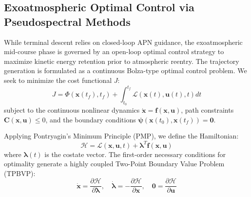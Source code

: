 \documentclass[11pt,a4paper]{article}
\theoremstyle{definition}
\numberwithin{equation}{section}
\begin{document}
\begin{appendices}
\section{Exoatmospheric Optimal Control via Pseudospectral Methods}
\label{app:optimal_control}

While terminal descent relies on closed-loop APN guidance, the exoatmospheric mid-course phase is governed by an open-loop optimal control strategy to maximize kinetic energy retention prior to atmospheric reentry. The trajectory generation is formulated as a continuous Bolza-type optimal control problem. We seek to minimize the cost functional $J$:
\begin{equation}
    J = \Phi(\mathbf{x}(t_f), t_f) + \int_{t_0}^{t_f} \mathcal{L}(\mathbf{x}(t), \mathbf{u}(t), t) dt
\end{equation}
subject to the continuous nonlinear dynamics $\mathbf{\dot{x}} = \mathbf{f}(\mathbf{x}, \mathbf{u})$, path constraints $\mathbf{C}(\mathbf{x}, \mathbf{u}) \leq 0$, and the boundary conditions $\boldsymbol{\psi}(\mathbf{x}(t_0), \mathbf{x}(t_f)) = \mathbf{0}$.

Applying Pontryagin's Minimum Principle (PMP), we define the Hamiltonian:
\begin{equation}
    \mathcal{H} = \mathcal{L}(\mathbf{x}, \mathbf{u}, t) + \boldsymbol{\lambda}^T \mathbf{f}(\mathbf{x}, \mathbf{u})
\end{equation}
where $\boldsymbol{\lambda}(t)$ is the costate vector. The first-order necessary conditions for optimality generate a highly coupled Two-Point Boundary Value Problem (TPBVP):
\begin{equation}
    \mathbf{\dot{x}} = \frac{\partial \mathcal{H}}{\partial \boldsymbol{\lambda}}, \quad \dot{\boldsymbol{\lambda}} = -\frac{\partial \mathcal{H}}{\partial \mathbf{x}}, \quad \mathbf{0} = \frac{\partial \mathcal{H}}{\partial \mathbf{u}}
\end{equation}


\end{appendices}
\end{document}
